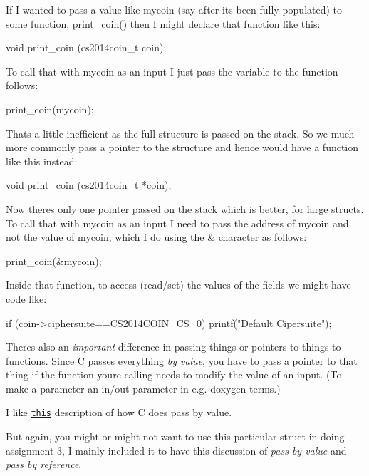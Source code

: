 If I wanted to pass a value like mycoin (say after it\textquotesingle{}s been fully populated) to some function, {\ttfamily print\+\_\+coin()} then I might declare that function like this\+: \begin{DoxyVerb}    void print_coin (cs2014coin_t coin);
\end{DoxyVerb}


To call that with mycoin as an input I just pass the variable to the function follows\+: \begin{DoxyVerb}    print_coin(mycoin);
\end{DoxyVerb}


That\textquotesingle{}s a little inefficient as the full structure is passed on the stack. So we much more commonly pass a pointer to the structure and hence would have a function like this instead\+: \begin{DoxyVerb}    void print_coin (cs2014coin_t *coin);
\end{DoxyVerb}


Now there\textquotesingle{}s only one pointer passed on the stack which is better, for large structs. To call that with mycoin as an input I need to pass the address of mycoin and not the value of mycoin, which I do using the \& character as follows\+: \begin{DoxyVerb}    print_coin(&mycoin);
\end{DoxyVerb}


Inside that function, to access (read/set) the values of the fields we might have code like\+:

\begin{DoxyVerb}    if (coin->ciphersuite==CS2014COIN_CS_0) {
        printf("Default Cipersuite\n");
    }
\end{DoxyVerb}


There\textquotesingle{}s also an {\itshape important} difference in passing things or pointers to things to functions. Since C passes everything {\itshape by value}, you have to pass a pointer to that thing if the function you\textquotesingle{}re calling needs to modify the value of an input. (To make a parameter an in/out parameter in e.\+g. doxygen terms.)

I like \href{https://denniskubes.com/2012/08/20/is-c-pass-by-value-or-reference/}{\tt this} description of how C does pass by value.

But again, you might or might not want to use this particular struct in doing assignment 3, I mainly included it to have this discussion of {\itshape pass by value} and {\itshape pass by reference}.

